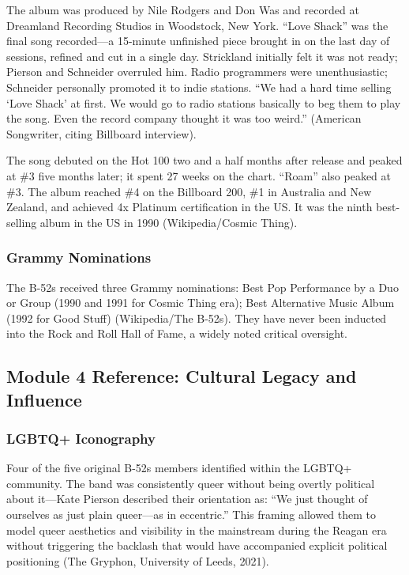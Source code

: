 \documentclass[11pt,letterpaper]{article}
\begin{document}
The album was produced by Nile Rodgers and Don Was and recorded at Dreamland Recording Studios in Woodstock, New York. ``Love Shack'' was the final song recorded---a 15-minute unfinished piece brought in on the last day of sessions, refined and cut in a single day. Strickland initially felt it was not ready; Pierson and Schneider overruled him. Radio programmers were unenthusiastic; Schneider personally promoted it to indie stations. ``We had a hard time selling `Love Shack' at first. We would go to radio stations basically to beg them to play the song. Even the record company thought it was too weird.'' (American Songwriter, citing Billboard interview).

The song debuted on the Hot 100 two and a half months after release and peaked at \#3 five months later; it spent 27 weeks on the chart. ``Roam'' also peaked at \#3. The album reached \#4 on the Billboard 200, \#1 in Australia and New Zealand, and achieved 4x Platinum certification in the US. It was the ninth best-selling album in the US in 1990 (Wikipedia/Cosmic Thing).

\subsubsection{Grammy Nominations}

The B-52s received three Grammy nominations: Best Pop Performance by a Duo or Group (1990 and 1991 for Cosmic Thing era); Best Alternative Music Album (1992 for Good Stuff) (Wikipedia/The B-52s). They have never been inducted into the Rock and Roll Hall of Fame, a widely noted critical oversight.

\subsection{Module 4 Reference: Cultural Legacy and Influence}

\subsubsection{LGBTQ+ Iconography}

Four of the five original B-52s members identified within the LGBTQ+ community. The band was consistently queer without being overtly political about it---Kate Pierson described their orientation as: ``We just thought of ourselves as just plain queer---as in eccentric.'' This framing allowed them to model queer aesthetics and visibility in the mainstream during the Reagan era without triggering the backlash that would have accompanied explicit political positioning (The Gryphon, University of Leeds, 2021).
\end{document}
